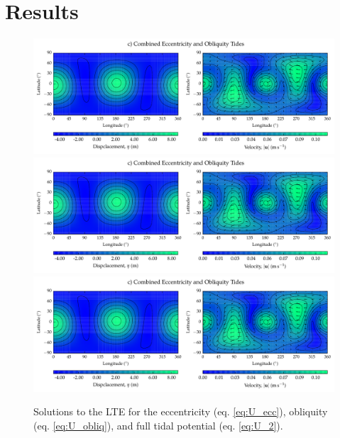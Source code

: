 \section{Results \label{sec:results}}

\begin{figure}[t]
\centering
\includegraphics[width=0.9\linewidth]{Figures/ODISPLOT}
\includegraphics[width=0.9\linewidth]{Figures/ODISPLOT}
\includegraphics[width=0.9\linewidth]{Figures/ODISPLOT}
\caption{Solutions to the LTE for the eccentricity (eq. \ref{eq:U_ecc}), obliquity (eq. \ref{eq:U_obliq}), and full tidal potential (eq. \ref{eq:U_2}).}
\end{figure}